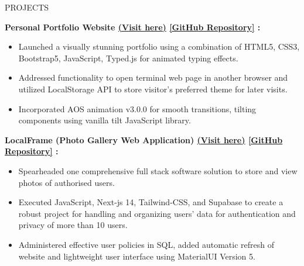 \documentclass{resume} %
\begin{document}
\begin{rSection}{PROJECTS}
    \vspace{-1.0em}
    
     \item \textbf{Personal Portfolio Website
    {\href{https://arkapg211002.github.io/}{(Visit here)}}
    {\href{https://github.com/arkapg211002/arkapg211002.github.io}{[GitHub Repository]}} :} 
    \vspace{-0.6em}
    \begin{itemize}
    \setlength\itemsep{-0.6em}
    \item Launched a visually stunning portfolio using a combination of HTML5, CSS3, Bootstrap5, JavaScript, Typed.js for animated typing effects.
    \item Addressed functionality to open terminal web page in another browser and utilized LocalStorage API to store visitor’s preferred theme for later visits.
    \item Incorporated AOS animation v3.0.0 for smooth transitions, tilting components using vanilla tilt JavaScript library.
    \end{itemize}
    
    \item \textbf{LocalFrame (Photo Gallery Web Application) 
    {\href{https://local-frame.vercel.app/}{(Visit here)}}
    {\href{https://github.com/arkapg211002/Local-Frame}{[GitHub Repository]}} :}
    \vspace{-0.6em}
    \begin{itemize}
    \setlength\itemsep{-0.6em}
     \item Spearheaded one comprehensive full stack software solution to store and view photos of authorised users.
    \item Executed JavaScript, Next-js 14, Tailwind-CSS, and Supabase to create a robust project for handling and organizing users' data for authentication and privacy of more than 10 users.
    \item Administered effective user policies in SQL, added automatic refresh of website and lightweight user interface using MaterialUI Version 5.
    \end{itemize}
    

\end{rSection}
\end{document}
